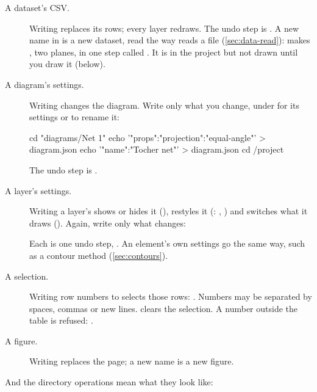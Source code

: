 \begin{description}
\item[A dataset's CSV.] Writing  replaces its rows; every layer redraws. The undo
step is . A new name in  is a new dataset, read the way  reads a
file (\cref{sec:data-read}): 
makes , two planes, in one step called . It is in the project but not drawn
until you draw it (below).
\item[A diagram's settings.] Writing  changes the diagram. Write only what you change,
under  for its settings or  to rename it:
\begin{codeblock}
cd "diagrams/Net 1"
echo '{"props":{"projection":"equal-angle"}}' > diagram.json
echo '{"name":"Tocher net"}' > diagram.json
cd /project
\end{codeblock}
The undo step is .
\item[A layer's settings.] Writing a layer's  shows or hides it (), restyles it
(: , ) and switches what it draws (). Again, write only
what changes:
Each is one undo step, . An element's own settings go the same way, such as a contour
method (\cref{sec:contours}).
\item[A selection.] Writing row numbers to  selects those rows:
. Numbers may be separated by spaces, commas or new lines.
 clears the selection. A number outside the table is refused: .
\item[A figure.] Writing  replaces the page; a new name is a new figure.
\end{description}

And the directory operations mean what they look like:


